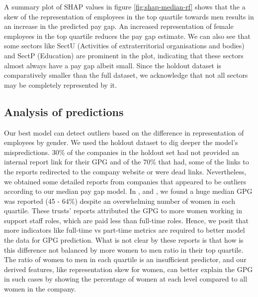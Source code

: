 A summary plot of SHAP values in figure \ref{fig:shap-median-rf} shows that the a skew of the representation of employees in the top quartile towards men results in an increase in the predicted pay gap. An increased representation of female employees in the top quartile reduces the pay gap estimate. We can also see that some sectors like SectU (Activities of extraterritorial organisations and bodies) and SectP (Education) are prominent in the plot, indicating that these sectors almost always have a pay gap albeit small. Since the holdout dataset is comparatively smaller than the full dataset, we acknowledge that not all sectors may be completely represented by it.


\subsection{Analysis of predictions}
Our best model can detect outliers based on the difference in representation of employees by gender. We used the holdout dataset to dig deeper the model's mispredictions. 30\% of the companies in the holdout set had not provided an internal report link for their GPG and of the 70\% that had, some of the links to the reports redirected to the company website or were dead links. Nevertheless, we obtained some detailed reports from companies that appeared to be outliers according to our median pay gap model. In \cite{PenkValleyAcademyTrust2019}, \cite{Aquinastrust2019} and \cite{ElevateMultiAcademyTrust2020}, we found a huge median GPG was reported (45 - 64\%) despite an overwhelming number of women in each quartile. These trusts' reports attributed the GPG to more women working in support staff roles, which are paid less than full-time roles. Hence, we posit that more indicators like full-time vs part-time metrics are required to better model the data for GPG prediction. What is not clear by these reports is that how is this difference not balanced by more women to men ratio in their top quartile. The ratio of women to men in each quartile is an insufficient predictor, and our derived features, like representation skew for women, can better explain the GPG in such cases by showing the percentage of women at each level compared to all women in the company.


